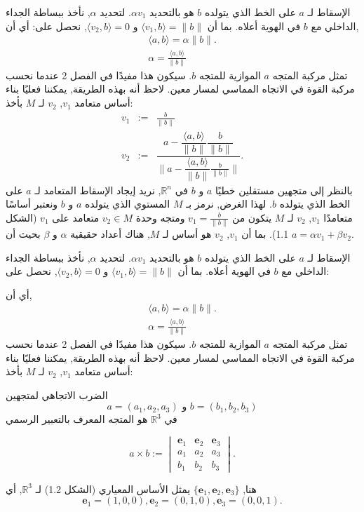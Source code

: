 الإسقاط لـ \( a \) على الخط الذي يتولده \( b \) هو بالتحديد \( \alpha v_1 \). لتحديد \( \alpha \), نأخذ ببساطة الجداء الداخلي مع \( b \) في الهوية أعلاه. بما أن \( \langle v_1, b \rangle = \|b\| \) و \( \langle v_2, b \rangle = 0 \), نحصل على:
أي أن,
\begin{eqnarray*}
\langle a, b \rangle = \alpha \|b\|.
\\
 \alpha = \frac{\langle a, b \rangle}{\|b\|}
\end{eqnarray*}
تمثل مركبة المتجه \( a \) الموازية للمتجه \( b \). سيكون هذا مفيدًا في الفصل 2 عندما نحسب مركبة القوة في الاتجاه المماسي لمسار معين. لاحظ أنه بهذه الطريقة, يمكننا فعليًا بناء أساس متعامد { \( v_1 \), \( v_2 \) } لـ \( M \) بأخذ:
\begin{eqnarray*}
 v_1 &:=& \frac{b}{\|b\|} \\
 v_2 &:=& \dfrac{a - \dfrac{\langle a, b \rangle}{\|b\|} \dfrac{b}{\|b\|}}{\|a - \dfrac{\langle a, b \rangle}{\|b\|} \frac{b}{\|b\|}\|}. 
\end{eqnarray*}
بالنظر إلى متجهين مستقلين خطيًا \( a \) و \( b \) في \( \mathbb{R}^n \), نريد إيجاد الإسقاط المتعامد لـ \( a \) على الخط الذي يتولده \( b \). لهذا الغرض, نرمز بـ \( M \) المستوي الذي يتولده \( a \) و \( b \) ونعتبر أساسًا متعامدًا { \( v_1 \), \( v_2 \) } لـ \( M \) يتكون من \( v_1 = \frac{b}{\|b\|} \) ومتجه وحدة \( v_2 \in M \) متعامد على \( v_1 \) (الشكل 1.1). بما أن { \( v_1 \), \( v_2 \) } هو أساس لـ \( M \), هناك أعداد حقيقية \( \alpha \) و \( \beta \) بحيث أن \( a = \alpha v_1 + \beta v_2 \).

الإسقاط لـ \( a \) على الخط الذي يتولده \( b \) هو بالتحديد \( \alpha v_1 \). لتحديد \( \alpha \), نأخذ ببساطة الجداء الداخلي مع \( b \) في الهوية أعلاه. بما أن \( \langle v_1, b \rangle = \|b\| \) و \( \langle v_2, b \rangle = 0 \), نحصل على:

أي أن,
\begin{eqnarray*}
\langle a, b \rangle = \alpha \|b\|.
\\
\alpha = \frac{\langle a, b \rangle}{\|b\|}
\end{eqnarray*}
تمثل مركبة المتجه \( a \) الموازية للمتجه \( b \). سيكون هذا مفيدًا في الفصل 2 عندما نحسب مركبة القوة في الاتجاه المماسي لمسار معين. لاحظ أنه بهذه الطريقة, يمكننا فعليًا بناء أساس متعامد { \( v_1 \), \( v_2 \) } لـ \( M \) بأخذ:

\begin{definition}
الضرب الاتجاهي لمتجهين
\[ a = (a_1, a_2, a_3) \text{ و } b = (b_1, b_2, b_3) \]
في \( \mathbb{R}^3 \) هو المتجه المعرف بالتعبير الرسمي

\[ a \times b := \begin{vmatrix} \mathbf{e}_1 & \mathbf{e}_2 & \mathbf{e}_3 \\ a_1 & a_2 & a_3 \\ b_1 & b_2 & b_3 \end{vmatrix}. \]

هنا, \(\{\mathbf{e}_1, \mathbf{e}_2, \mathbf{e}_3\}\) يمثل الأساس المعياري (الشكل 1.2) لـ \( \mathbb{R}^3 \), أي
\[ \mathbf{e}_1 = (1, 0, 0), \mathbf{e}_2 = (0, 1, 0), \mathbf{e}_3 = (0, 0, 1). \]
\end{definition}

